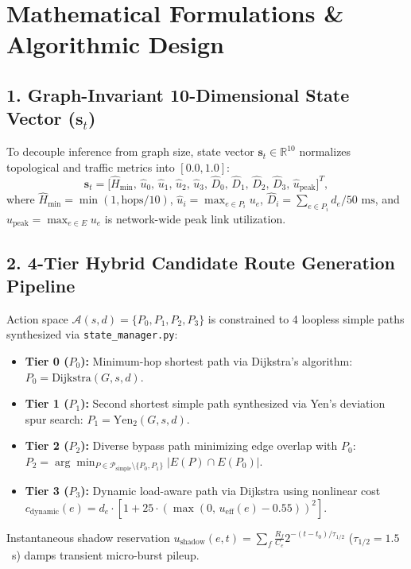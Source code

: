 \documentclass[10pt,a4paper]{article}
\newcommand{\code}[1]{\texttt{#1}}
\begin{document}
\newpage


\section{Mathematical Formulations \& Algorithmic Design}

\subsection{1. Graph-Invariant 10-Dimensional State Vector (\texorpdfstring{$\mathbf{s}_t$}{s\_t})}
To decouple inference from graph size, state vector $\mathbf{s}_t \in \mathbb{R}^{10}$ normalizes topological and traffic metrics into $[0.0, 1.0]$:
\begin{equation}
\mathbf{s}_t = \big[\hat{H}_{\text{min}},\, \hat{u}_0,\, \hat{u}_1,\, \hat{u}_2,\, \hat{u}_3,\, \hat{D}_0,\, \hat{D}_1,\, \hat{D}_2,\, \hat{D}_3,\, \hat{u}_{\text{peak}}\big]^T,
\end{equation}
where $\hat{H}_{\text{min}} = \min(1, \text{hops}/10)$, $\hat{u}_i = \max_{e \in P_i} u_e$, $\hat{D}_i = \sum_{e \in P_i} d_e / 50\text{ ms}$, and $\hat{u}_{\text{peak}} = \max_{e \in E} u_e$ is network-wide peak link utilization.

\subsection{2. 4-Tier Hybrid Candidate Route Generation Pipeline}
Action space $\mathcal{A}(s, d) = \{P_0, P_1, P_2, P_3\}$ is constrained to 4 loopless simple paths synthesized via \code{state\_manager.py}:
\begin{itemize}[noitemsep,leftmargin=*]
  \item \textbf{Tier 0 ($P_0$):} Minimum-hop shortest path via Dijkstra's algorithm: $P_0 = \text{Dijkstra}(G, s, d)$.
  \item \textbf{Tier 1 ($P_1$):} Second shortest simple path synthesized via Yen's deviation spur search: $P_1 = \text{Yen}_2(G, s, d)$.
  \item \textbf{Tier 2 ($P_2$):} Diverse bypass path minimizing edge overlap with $P_0$: $P_2 = \arg\min_{P \in \mathcal{P}_{\text{simple}} \setminus \{P_0, P_1\}} |E(P) \cap E(P_0)|$.
  \item \textbf{Tier 3 ($P_3$):} Dynamic load-aware path via Dijkstra using nonlinear cost $c_{\text{dynamic}}(e) = d_e \cdot \left[1 + 25 \cdot \left(\max(0, \, u_{\text{eff}}(e)-0.55)\right)^2\right]$.
\end{itemize}
Instantaneous shadow reservation $u_{\text{shadow}}(e, t) = \sum_f \frac{R_f}{C_e} 2^{-(t-t_0)/\tau_{1/2}}$ ($\tau_{1/2}=1.5$~s) damps transient micro-burst pileup.
\end{document}
